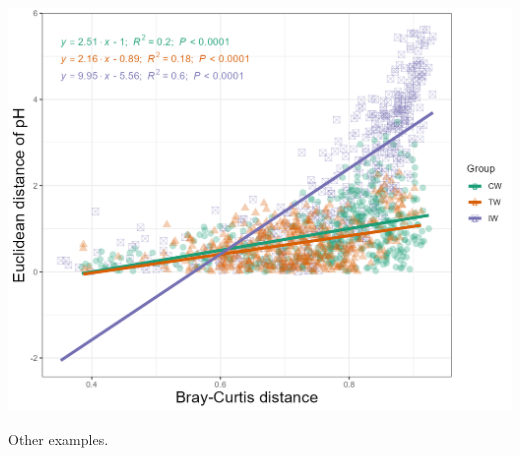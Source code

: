 \documentclass[
]{book}
\begin{document}
\begin{center}\includegraphics[width=550px]{Images/trans_env_scatterfit_lmgroup} \end{center}

Other examples.
\end{document}

